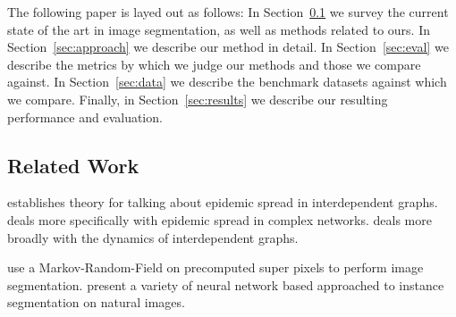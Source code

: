 \documentclass[twocolumn]{article}
\newcommand{\secref}[1]{Section~\ref{sec:#1}}
\newcommand{\seclab}[1]{\label{sec:#1}}
\begin{document}
The following paper is layed out as follows: In \secref{related} we survey the
current state of the art in image segmentation, as well as methods related to
ours. In \secref{approach} we describe our method in detail. In \secref{eval} we
describe the metrics by which we judge our methods and those we compare against.
In \secref{data} we describe the benchmark datasets against which we compare.
Finally, in \secref{results} we describe our resulting performance and
evaluation.

\subsection{Related Work}\seclab{related}

\cite{son2012percolation} establishes theory for talking about epidemic spread
in interdependent graphs. \cite{pastor2015epidemic, pellis2015eight} deals more
specifically with epidemic spread in complex networks.
\cite{boccaletti2014structure, kivela2014multilayer} deals more broadly with the
dynamics of interdependent graphs.

\cite{pei2014saliency} use a Markov-Random-Field on precomputed super pixels to
perform image segmentation.  \cite{newell2017associative, li2017fully,
ren2017end} present a variety of neural network based approached to instance
segmentation on natural images.
\end{document}
